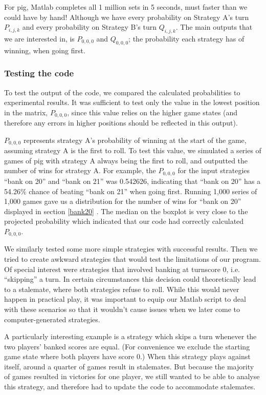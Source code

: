 \documentclass[a4paper,titlepage]{article}
\begin{document}
For pig, Matlab completes all 1 million sets in 5 seconds, must faster than we could have by hand! Although we have every probability on Strategy A's turn $P_{i,j,k}$ and every probability on Strategy B's turn $Q_{i,j,k}$. The main outputs that we are interested in, is $P_{0,0,0}$ and $Q_{0,0,0}$; the probability each strategy has of winning, when going first.

\subsubsection{Testing the code}


To test the output of the code, we compared the calculated probabilities to experimental results. It was sufficient to test only the value in the lowest position in the matrix, $P_{0,0,0}$, since this value relies on the higher game states (and therefore any errors in higher positions should be reflected in this output).

$P_{0,0,0}$ represents strategy A's probability of winning at the start of the game, assuming strategy A is the first to roll. To test this value, we simulated a series of games of pig with strategy A always being the first to roll, and outputted the number of wins for strategy A. For example, the $P_{0,0,0}$ for the input strategies ``bank on 20'' and ``bank on 21'' was 0.542626, indicating that ``bank on 20'' has a 54.26\% chance of beating ``bank on 21'' when going first. Running 1,000 series of 1,000 games gave us a distribution for the number of wins for ``bank on 20'' displayed in section \ref{bank20}
. The median on the boxplot is very close to the projected probability which indicated that our code had correctly calculated $P_{0,0,0}$.

We similarly tested some more simple strategies with successful results. Then we tried to create awkward strategies that would test the limitations of our program. Of special interest were strategies that involved banking at turnscore 0, i.e. ``skipping'' a turn. In certain circumstances this decision could theoretically lead to a stalemate, where both strategies refuse to roll. While this would never happen in practical play, it was important to equip our Matlab script to deal with these scenarios so that it wouldn't cause issues when we later come to computer-generated strategies.

A particularly interesting example is a strategy which skips a turn whenever the two players' banked scores are equal. (For convenience we exclude the starting game state where both players have score 0.) When this strategy plays against itself, around a quarter of games result in stalemates. But because the majority of games resulted in victories for one player, we still wanted to be able to analyse this strategy, and therefore had to update the code to accommodate stalemates.
\end{document}
